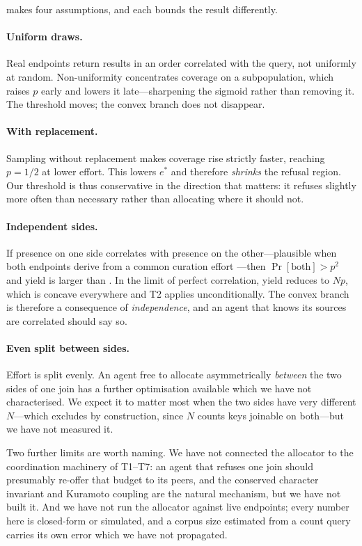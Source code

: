 \documentclass[11pt,twocolumn,a4paper]{article}
\theoremstyle{thmstyle}
\theoremstyle{definition}
\theoremstyle{remark}
\newcommand{\estar}{e^{*}}
\begin{document}
 makes four assumptions, and each bounds the result
differently.

\paragraph{Uniform draws.} Real endpoints return results in an order
correlated with the query, not uniformly at random. Non-uniformity
concentrates coverage on a subpopulation, which raises $p$ early and
lowers it late---sharpening the sigmoid rather than removing it. The
threshold moves; the convex branch does not disappear.

\paragraph{With replacement.} Sampling without replacement makes coverage
rise strictly faster, reaching $p=1/2$ at lower effort. This lowers
$\estar$ and therefore \emph{shrinks} the refusal region. Our threshold
is thus conservative in the direction that matters: it refuses slightly
more often than necessary rather than allocating where it should not.

\paragraph{Independent sides.} If presence on one side correlates with
presence on the other---plausible when both endpoints derive from a
common curation effort \citep{bansal2022rhea}---then
$\Pr[\text{both}]>p^{2}$ and yield is larger than . In the
limit of perfect correlation, yield reduces to $Np$, which is concave
everywhere and T2 applies unconditionally. The convex branch is therefore
a consequence of \emph{independence}, and an agent that knows its sources
are correlated should say so.

\paragraph{Even split between sides.} Effort is split evenly. An agent
free to allocate asymmetrically \emph{between} the two sides of one join
has a further optimisation available which we have not characterised. We
expect it to matter most when the two sides have very different
$N$---which  excludes by construction, since $N$ counts
keys joinable on both---but we have not measured it.

Two further limits are worth naming. We have not connected the allocator
to the coordination machinery of T1--T7: an agent that refuses one join
should presumably re-offer that budget to its peers, and the conserved
character invariant and Kuramoto coupling
\citep{sachikonye2026splitattention,kuramoto1975} are the natural
mechanism, but we have not built it. And we have not run the allocator
against live endpoints; every number here is closed-form or simulated,
and a corpus size estimated from a count query carries its own error
which we have not propagated.
\end{document}
